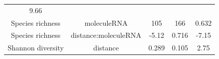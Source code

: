 \documentclass[]{article}
\begin{document}
\begin{longtable}[]{@{}ccccc@{}}
\begin{minipage}[t]{0.14\columnwidth}
9.66\strut
\end{minipage}\tabularnewline
\begin{minipage}[t]{0.21\columnwidth}\centering\strut
Species richness\strut
\end{minipage} & \begin{minipage}[t]{0.25\columnwidth}\centering\strut
moleculeRNA\strut
\end{minipage} & \begin{minipage}[t]{0.12\columnwidth}\centering\strut
105\strut
\end{minipage} & \begin{minipage}[t]{0.14\columnwidth}\centering\strut
166\strut
\end{minipage} & \begin{minipage}[t]{0.14\columnwidth}\centering\strut
0.632\strut
\end{minipage}\tabularnewline
\begin{minipage}[t]{0.21\columnwidth}\centering\strut
Species richness\strut
\end{minipage} & \begin{minipage}[t]{0.25\columnwidth}\centering\strut
distance:moleculeRNA\strut
\end{minipage} & \begin{minipage}[t]{0.12\columnwidth}\centering\strut
-5.12\strut
\end{minipage} & \begin{minipage}[t]{0.14\columnwidth}\centering\strut
0.716\strut
\end{minipage} & \begin{minipage}[t]{0.14\columnwidth}\centering\strut
-7.15\strut
\end{minipage}\tabularnewline
\begin{minipage}[t]{0.21\columnwidth}\centering\strut
Shannon diversity\strut
\end{minipage} & \begin{minipage}[t]{0.25\columnwidth}\centering\strut
distance\strut
\end{minipage} & \begin{minipage}[t]{0.12\columnwidth}\centering\strut
0.289\strut
\end{minipage} & \begin{minipage}[t]{0.14\columnwidth}\centering\strut
0.105\strut
\end{minipage} & \begin{minipage}[t]{0.14\columnwidth}\centering\strut
2.75\strut
\end{minipage}\tabularnewline

\end{longtable}
\end{document}
